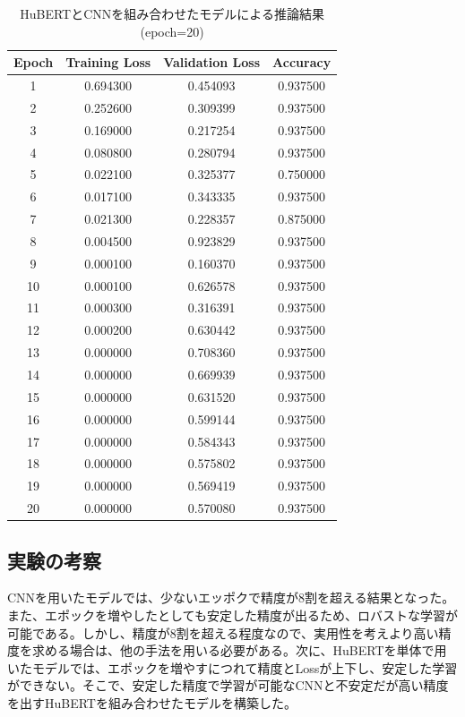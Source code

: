 \documentclass[10pt]{ltjsarticle}
\begin{document}
\begin{table}[h]
\centering
\caption{HuBERTとCNNを組み合わせたモデルによる推論結果(epoch=20)}
\begin{tabular}{c c c c}
\hline
\textbf{Epoch} & \textbf{Training Loss} & \textbf{Validation Loss} & \textbf{Accuracy} \\
\hline
1  & 0.694300 & 0.454093 & 0.937500 \\
2  & 0.252600 & 0.309399 & 0.937500 \\
3  & 0.169000 & 0.217254 & 0.937500 \\
4  & 0.080800 & 0.280794 & 0.937500 \\
5  & 0.022100 & 0.325377 & 0.750000 \\
6  & 0.017100 & 0.343335 & 0.937500 \\
7  & 0.021300 & 0.228357 & 0.875000 \\
8  & 0.004500 & 0.923829 & 0.937500 \\
9  & 0.000100 & 0.160370 & 0.937500 \\
10 & 0.000100 & 0.626578 & 0.937500 \\
11 & 0.000300 & 0.316391 & 0.937500 \\
12 & 0.000200 & 0.630442 & 0.937500 \\
13 & 0.000000 & 0.708360 & 0.937500 \\
14 & 0.000000 & 0.669939 & 0.937500 \\
15 & 0.000000 & 0.631520 & 0.937500 \\
16 & 0.000000 & 0.599144 & 0.937500 \\
17 & 0.000000 & 0.584343 & 0.937500 \\
18 & 0.000000 & 0.575802 & 0.937500 \\
19 & 0.000000 & 0.569419 & 0.937500 \\
20 & 0.000000 & 0.570080 & 0.937500 \\
\hline
\end{tabular}
\end{table}

\subsection{実験の考察}

CNNを用いたモデルでは、少ないエッポクで精度が8割を超える結果となった。また、エポックを増やしたとしても安定した精度が出るため、ロバストな学習が可能である。しかし、精度が8割を超える程度なので、実用性を考えより高い精度を求める場合は、他の手法を用いる必要がある。次に、HuBERTを単体で用いたモデルでは、エポックを増やすにつれて精度とLossが上下し、安定した学習ができない。そこで、安定した精度で学習が可能なCNNと不安定だが高い精度を出すHuBERTを組み合わせたモデルを構築した。
\end{document}
